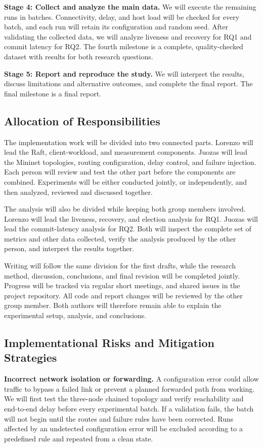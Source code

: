 \documentclass[11pt,a4paper]{article}
\begin{document}
\textbf{Stage 4: Collect and analyze the main data.}
We will execute the remaining runs in batches. Connectivity, delay, and host load will be checked for every batch, and each run will retain its configuration and random seed. After validating the collected data, we will analyze liveness and recovery for RQ1 and commit latency for RQ2. The fourth milestone is a complete, quality-checked dataset with results for both research questions.

\textbf{Stage 5: Report and reproduce the study.}
We will interpret the results, discuss limitations and alternative outcomes, and complete the final report. The final milestone is a final report.

\subsection{Allocation of Responsibilities}

The implementation work will be divided into two connected parts. 
Lorenzo will lead the Raft, client-workload, and measurement components. 
Juozas will lead the Mininet topologies, routing configuration, delay control, and failure injection. 
Each person will review and test the other part before the components are combined. 
Experiments will be either conducted jointly, or independently, and then analyzed, reviewed and discussed together.

The analysis will also be divided while keeping both group members involved. 
Lorenzo will lead the liveness, recovery, and election analysis for RQ1. 
Juozas will lead the commit-latency analysis for RQ2. 
Both will inspect the complete set of metrics and other data collected, 
verify the analysis produced by the other person, and interpret the results together. 

Writing will follow the same division for the first drafts, while the research method, discussion, conclusions, and final revision will be completed jointly. 
Progress will be tracked via regular short meetings, and shared issues in the project repository. 
All code and report changes will be reviewed by the other group member. 
Both authors will therefore remain able to explain the experimental setup, analysis, and conclusions.

\subsection{Implementational Risks and Mitigation Strategies}

\textbf{Incorrect network isolation or forwarding.}
A configuration error could allow traffic to bypass a failed link or prevent a planned forwarded path from working. We will first test the three-node chained topology and verify reachability and end-to-end delay before every experimental batch. If a validation fails, the batch will not begin until the routes and failure rules have been corrected. Runs affected by an undetected configuration error will be excluded according to a predefined rule and repeated from a clean state.
\end{document}

